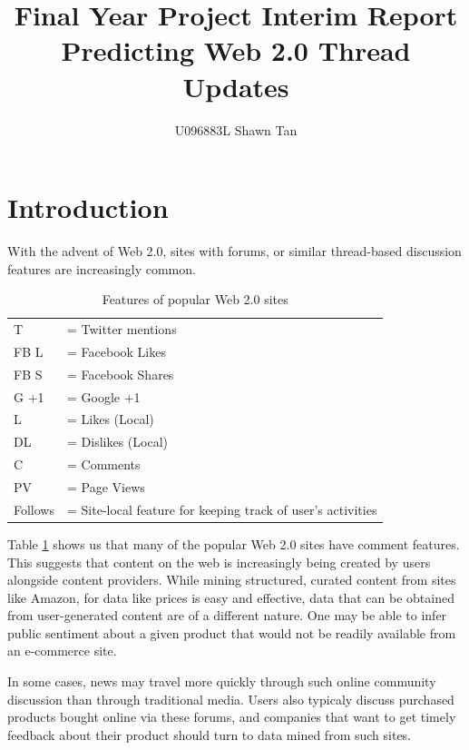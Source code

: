 \documentclass[12 pt]{article}
\title{Final Year Project Interim Report\\ Predicting Web 2.0 Thread Updates}
\author{U096883L Shawn Tan}
\date{}
\begin{document}
\doublespacing
\maketitle
\section{Introduction}
With the advent of Web 2.0, sites with forums, or similar thread-based discussion features are increasingly common.

\begin{table}\label{table:web20}
	{\footnotesize
\caption{Features of popular Web 2.0 sites}
	\begin{tabular}{l l}
		T &= Twitter mentions\\
	 FB L &= Facebook Likes \\
		FB S &= Facebook Shares\\
	G +1 &= Google +1\\
		   L&= Likes (Local) \\
   		DL &= Dislikes (Local) \\
			C &= Comments \\
		PV &= Page Views \\
   Follows &= Site-local feature for keeping track of user's activities
	\end{tabular}
}

\end{table}

Table \ref{table:web20} shows us that many of the popular Web 2.0 sites have comment features. This suggests that content on the web is increasingly being created by users alongside content providers. While mining structured, curated content from sites like Amazon, for data like prices is easy and effective, data that can be obtained from user-generated content are of a different nature. One may be able to infer public sentiment about a given product that would not be readily available from an e-commerce site.

In some cases, news may travel more quickly through such online community discussion than through traditional media.
Users also typicaly discuss purchased products bought online via these forums, and companies that want to get timely
feedback about their product should turn to data mined from such sites.
\end{document}

